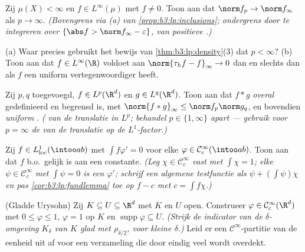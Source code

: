 \begin{exercise}[$\star\star$]\label{exo:b3:lp:4}
Zij $\mu(X) < \infty$ en $f \in L^\infty(\mu)$ met $f \neq 0$.
Toon aan dat $\norm f_p \to \norm f_\infty$ als $p \to \infty$.
\emph{(Bovengrens via (a) van \cref{prop:b3:lp:inclusions};
ondergrens door te integreren over $\{\abs f > \norm f_\infty -
\varepsilon\}$, van positieve .)}
\end{exercise}

\begin{exercise}[$\star\star$]\label{exo:b3:lp:5}
(a) Waar precies gebruikt het bewijs van
\cref{thm:b3:lp:density}(3) dat $p < \infty$?
(b) Toon aan dat $f \in L^\infty(\R)$ voldoet aan
$\norm{\tau_hf - f}_\infty \to 0$ dan en slechts dan als $f$ een
uniform  vertegenwoordiger heeft.
\end{exercise}

\begin{exercise}[$\star\star$]\label{exo:b3:lp:6}
Zij $p, q$ toegevoegd, $f \in L^p(\R^d)$ en $g \in L^q(\R^d)$.
Toon aan dat $f * g$ \emph{overal} gedefinieerd en begrensd is,
met $\norm{f*g}_\infty \leq \norm f_p\norm g_q$, en bovendien
\emph{uniform }. \emph{( van de translatie in
$L^p$; behandel $p \in \{1, \infty\}$ apart --- gebruik voor $p =
\infty$ de  van de translatie op de
$L^1$-factor.)}
\end{exercise}

\begin{exercise}[$\star\star$]\label{exo:b3:lp:7}
Zij $f \in L^1_{\mathrm{loc}}(\intoo ab)$ met $\int f\varphi' =
0$ voor elke $\varphi \in \mathcal C^\infty_c(\intoo ab)$. Toon
aan dat $f$ b.o.\ gelijk is aan een constante. \emph{(Leg $\chi
\in \mathcal C_c^\infty$ vast met $\int\chi = 1$; elke $\psi \in
\mathcal C_c^\infty$ met $\int\psi = 0$ is een $\varphi'$;
schrijf een algemene testfunctie als $\psi + (\int\psi)\chi$ en
pas \cref{cor:b3:lp:fundlemma} toe op $f - c$ met $c = \int
f\chi$.)}
\end{exercise}

\begin{exercise}[$\star\star\star$]\label{exo:b3:lp:8}
(Gladde Urysohn) Zij $K \subseteq U \subseteq \R^d$ met $K$
 en $U$ open. Construeer $\varphi \in \mathcal
C^\infty_c(\R^d)$ met $0 \leq \varphi \leq 1$, $\varphi = 1$ op
$K$ en $\operatorname{supp}\varphi \subseteq U$.
\emph{(Strijk de indicator van de $\delta$-omgeving $K_\delta$
van $K$ glad met $\rho_{\delta/2}$, voor kleine $\delta$.)}
Leid er een $\mathcal C^\infty$-partitie van de eenheid uit af
voor een  verzameling die door eindig veel  wordt overdekt.
\end{exercise}

